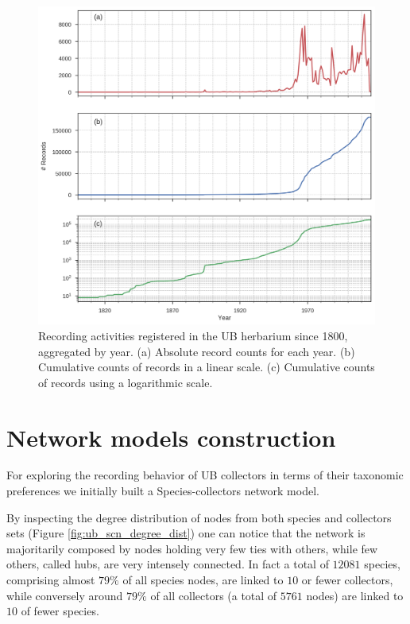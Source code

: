  \begin{figure}[h!]
  	\centering
    \includegraphics[width=\linewidth]{figures/ub_records_timeseries.png}
    \caption{Recording activities registered in the UB herbarium since 1800, aggregated by year. (a) Absolute record counts for each year. (b) Cumulative counts of records in a linear scale. (c) Cumulative counts of records using a logarithmic scale.}
    \label{fig:ub_records_timeseries}
  \end{figure}


\section{Network models construction}


For exploring the recording behavior of UB collectors in terms of their taxonomic preferences we initially built a Species-collectors network model.

By inspecting the degree distribution of nodes from both species and collectors sets (Figure \ref{fig:ub_scn_degree_dist}) one can notice that the network is majoritarily composed by nodes holding very few ties with others, while few others, called hubs, are very intensely connected. 
In fact a total of $12081$ species, comprising almost $79\%$ of all species nodes, are linked to $10$ or fewer collectors, while conversely around $79\%$ of all collectors (a total of $5761$ nodes) are linked to $10$ of fewer species.

